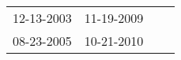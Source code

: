 \begin{supertabular}{llll}
 12-13-2003 &  11-19-2009 \\
 08-23-2005 &  10-21-2010 \\
\end{supertabular}
